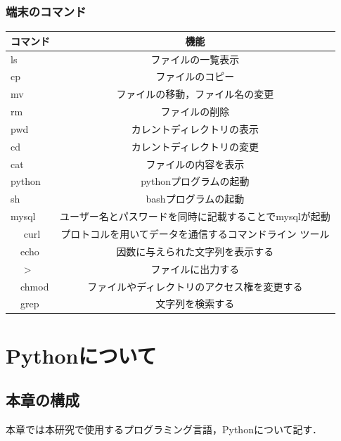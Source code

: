 \subsection{端末のコマンド}

\begin{table}[htb]
  \begin{center}
  \begin{tabular}{|l|c|} \hline
    コマンド & 機能 \\ \hline \hline
    ls & ファイルの一覧表示 \\  \hline
    cp & ファイルのコピー \\  \hline
    mv & ファイルの移動，ファイル名の変更 \\ \hline
    rm & ファイルの削除 \\  \hline
    pwd & カレントディレクトリの表示 \\  \hline
    cd & カレントディレクトリの変更 \\ \hline
    cat & ファイルの内容を表示 \\  \hline
   python & pythonプログラムの起動  \\  \hline
   sh & bashプログラムの起動 \\  \hline
  mysql & ユーザー名とパスワードを同時に記載することでmysqlが起動 \\ \hline
　 curl & プロトコルを用いてデータを通信するコマンドライン ツール \\  \hline
　echo & 因数に与えられた文字列を表示する \\  \hline
　  > & ファイルに出力する \\  \hline
　chmod &ファイルやディレクトリのアクセス権を変更する \\  \hline
　grep & 文字列を検索する \\  \hline
  \end{tabular}
  \end{center}
\end{table}


\clearpage


\chapter{Pythonについて}

\section{本章の構成}
本章では本研究で使用するプログラミング言語，Pythonについて記す．



